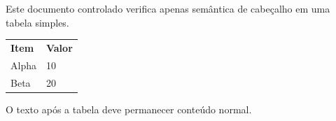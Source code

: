 \documentclass{abntexto-ufc}
\begin{document}
\textual

Este documento controlado verifica apenas semântica de cabeçalho em uma tabela simples.


\begin{tabular}{ll}
\textbf{Item} & \textbf{Valor} \\
Alpha & 10 \\
Beta & 20
\end{tabular}

O texto após a tabela deve permanecer conteúdo normal.
\end{document}
